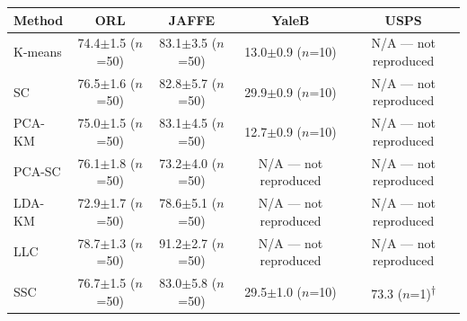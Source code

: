 \begin{tabular}{lcccc}
\toprule
Method & ORL & JAFFE & YaleB & USPS \\
\midrule
K-means & 74.4$\pm$1.5 ($n$=50) & 83.1$\pm$3.5 ($n$=50) & 13.0$\pm$0.9 ($n$=10) & N/A --- not reproduced \\
SC & 76.5$\pm$1.6 ($n$=50) & 82.8$\pm$5.7 ($n$=50) & 29.9$\pm$0.9 ($n$=10) & N/A --- not reproduced \\
PCA-KM & 75.0$\pm$1.5 ($n$=50) & 83.1$\pm$4.5 ($n$=50) & 12.7$\pm$0.9 ($n$=10) & N/A --- not reproduced \\
PCA-SC & 76.1$\pm$1.8 ($n$=50) & 73.2$\pm$4.0 ($n$=50) & N/A --- not reproduced & N/A --- not reproduced \\
LDA-KM & 72.9$\pm$1.7 ($n$=50) & 78.6$\pm$5.1 ($n$=50) & N/A --- not reproduced & N/A --- not reproduced \\
LLC & 78.7$\pm$1.3 ($n$=50) & 91.2$\pm$2.7 ($n$=50) & N/A --- not reproduced & N/A --- not reproduced \\
SSC & 76.7$\pm$1.5 ($n$=50) & 83.0$\pm$5.8 ($n$=50) & 29.5$\pm$1.0 ($n$=10) & 73.3 ($n$=1)\textsuperscript{$\dagger$} \\
\bottomrule
\end{tabular}
